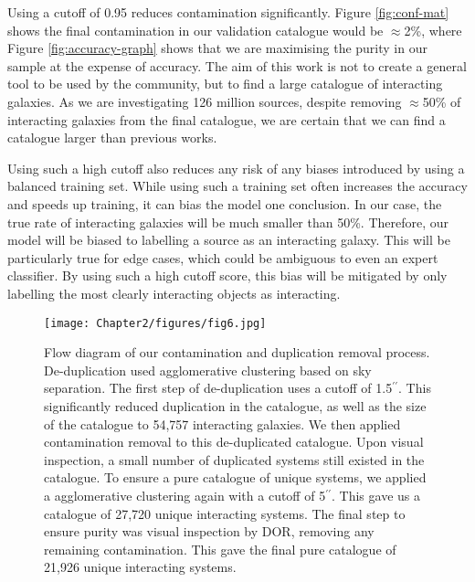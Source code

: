 Using a cutoff of 0.95 reduces contamination significantly. Figure \ref{fig:conf-mat} shows the final contamination in our validation catalogue would be $\approx$2\%, where Figure \ref{fig:accuracy-graph} shows that we are maximising the purity in our sample at the expense of accuracy. The aim of this work is not to create a general tool to be used by the community, but to find a large catalogue of interacting galaxies. As we are investigating 126 million sources, despite removing $\approx$50\% of interacting galaxies from the final catalogue, we are certain that we can find a catalogue larger than previous works.

Using such a high cutoff also reduces any risk of any biases introduced by using a balanced training set. While using such a training set often increases the accuracy and speeds up training, it can bias the model \DIFdelbegin {}\DIFdelend \DIFaddbegin {}\DIFaddend one conclusion. In our case, the true rate of interacting galaxies will be much smaller than 50\%. Therefore, our model will be biased to labelling a source as an interacting galaxy. This will be particularly true for edge cases, which could be ambiguous to even an expert classifier. By using such a high cutoff score, this bias will be mitigated by only labelling the most clearly interacting objects as interacting.

\begin{figure}
    \centering
    \texttt{[image: Chapter2/figures/fig6.jpg]}
    \caption[Flow diagram of our contamination and duplication removal process.]{Flow diagram of our contamination and duplication removal process. De-duplication used agglomerative clustering based on sky separation. The first step of de-duplication uses a cutoff of 1.5$^{\prime\prime}$. This significantly reduced duplication in the catalogue, as well as the size of the catalogue to 54,757 interacting galaxies. We then applied contamination removal to this de-duplicated catalogue. Upon visual inspection, a small number of duplicated systems still existed in the catalogue. To ensure a pure catalogue of unique systems, we applied a agglomerative clustering again with a cutoff of 5$^{\prime\prime}$. This gave us a catalogue of 27,720 unique interacting systems. The final step to ensure purity was visual inspection by DOR, removing any remaining contamination. This gave the final pure catalogue of 21,926 unique interacting systems.}
    \label{fig:flow-diagram}
\end{figure}


